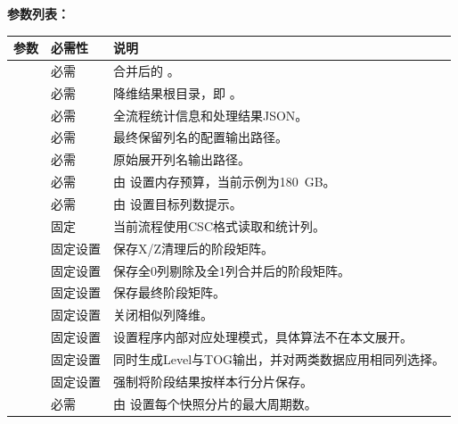 \textbf{参数列表：}
\begin{longtable}{L{0.31\textwidth}L{0.14\textwidth}L{0.43\textwidth}}
\toprule 参数 & 必需性 & 说明 \\ \midrule
{} & 必需 & 合并后的 。 \\
 & 必需 & 降维结果根目录，即 。 \\
 & 必需 & 全流程统计信息和处理结果JSON。 \\
 & 必需 & 最终保留列名的配置输出路径。 \\
 & 必需 & 原始展开列名输出路径。 \\
 & 必需 & 由  设置内存预算，当前示例为180~GB。 \\
 & 必需 & 由  设置目标列数提示。 \\
 & 固定 & 当前流程使用CSC格式读取和统计列。 \\
 & 固定设置 & 保存X/Z清理后的阶段矩阵。 \\
 & 固定设置 & 保存全0列剔除及全1列合并后的阶段矩阵。 \\
 & 固定设置 & 保存最终阶段矩阵。 \\
 & 固定设置 & 关闭相似列降维。 \\
 & 固定设置 & 设置程序内部对应处理模式，具体算法不在本文展开。 \\
 & 固定设置 & 同时生成Level与TOG输出，并对两类数据应用相同列选择。 \\
 & 固定设置 & 强制将阶段结果按样本行分片保存。 \\
 & 必需 & 由  设置每个快照分片的最大周期数。 \\
\bottomrule
\end{longtable}

